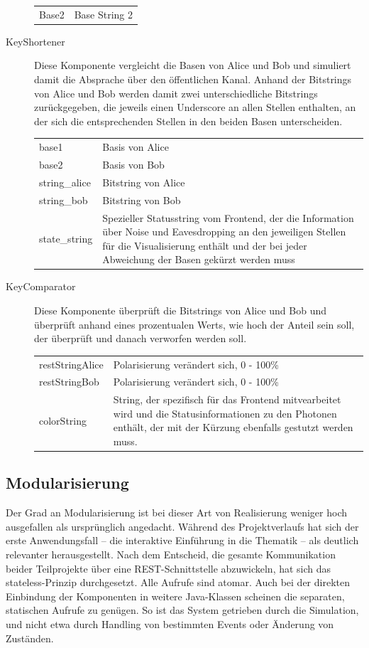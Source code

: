 \documentclass[a4paper,10.2pt,pdftex]{scrartcl}%
\begin{document}
\begin{description}
\begin{tabular}{p{3cm}p{9cm}}
Base2 & Base String 2  
\end{tabular}
\item[KeyShortener] 
Diese Komponente vergleicht die Basen von Alice und Bob und simuliert damit die Absprache über den öffentlichen Kanal. Anhand der Bitstrings von Alice und Bob werden damit zwei unterschiedliche Bitstrings zurückgegeben, die jeweils einen Underscore an allen Stellen enthalten, an der sich die entsprechenden Stellen in den beiden Basen unterscheiden. 
\\
\begin{tabular}{p{3cm}p{7.5cm}}
base1  & Basis von Alice \\
base2  & Basis von Bob \\
string\_alice &  Bitstring von Alice \\
string\_bob & Bitstring von Bob \\ 
state\_string & Spezieller Statusstring vom Frontend, der die Information über Noise und Eavesdropping an den jeweiligen Stellen für die Visualisierung enthält und der bei jeder Abweichung der Basen gekürzt werden muss \\
\end{tabular} 
\item[KeyComparator] 
Diese Komponente überprüft die Bitstrings von Alice und Bob und überprüft anhand eines prozentualen Werts, wie hoch der Anteil sein soll, der überprüft und danach verworfen werden soll. \\
\begin{tabular}{p{3cm}p{7.5cm}}
restStringAlice  & Polarisierung verändert sich, 0 - 100\% \\
restStringBob & Polarisierung verändert sich, 0 - 100\% \\
colorString & String, der spezifisch für das Frontend mitvearbeitet wird und die Statusinformationen zu den Photonen enthält, der mit der Kürzung ebenfalls gestutzt werden muss. 
\end{tabular} 
\end{description}
\subsection{Modularisierung}
Der Grad an Modularisierung ist bei dieser Art von Realisierung weniger hoch ausgefallen als ursprünglich angedacht. Während des Projektverlaufs hat sich der erste Anwendungsfall -- die interaktive Einführung in die Thematik -- als deutlich relevanter herausgestellt. Nach dem Entscheid, die gesamte Kommunikation beider Teilprojekte über eine REST-Schnittstelle abzuwickeln, hat sich das stateless-Prinzip durchgesetzt. Alle Aufrufe sind atomar. Auch bei der direkten Einbindung der Komponenten in weitere Java-Klassen scheinen die separaten, statischen Aufrufe zu genügen. So ist das System getrieben durch die Simulation, und nicht etwa durch Handling von bestimmten Events oder Änderung von Zuständen. 
\end{document}
